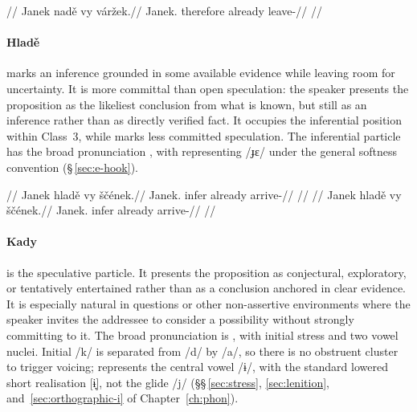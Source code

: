\pex
\begingl
\glpreamble {}//
\gla Janek nadě vy váržek.//
\glb Janek.\Dir{} therefore already leave-\Pf{}//
\glft {}//
\endgl
\xe

\paragraph{Hladě}  marks an inference grounded in some available
evidence while leaving room for uncertainty. It is more committal than open
speculation: the speaker presents the proposition as the likeliest conclusion
from what is known, but still as an inference rather than as directly verified
fact. It occupies the inferential position within Class~3, while
 marks less committed speculation. The inferential particle
 has the broad pronunciation \ipagloss{[ˈxla.ɟɛ]}, with
 representing /ɟɛ/ under the general softness convention
(§\,\ref{sec:e-hook}).

\pex
\a
\begingl
\glpreamble {}//
\gla Janek hladě vy ščének.//
\glb Janek.\Dir{} infer already arrive-\Pf{}//
\glft {}//
\endgl
\a
\begingl
\glpreamble {}//
\gla \ljudge{\#}Janek hladě vy ščének.//
\glb Janek.\Dir{} infer already arrive-\Pf{}//
\glft {}//
\endgl
\xe

\paragraph{Kady}  is the speculative particle. It presents the
proposition as conjectural, exploratory, or tentatively entertained rather
than as a conclusion anchored in clear evidence. It is especially natural in
questions or other non-assertive environments where the speaker invites the
addressee to consider a possibility without strongly committing to it.
The broad pronunciation is \ipagloss{[ˈka.dɨ̞]}, with initial stress and two
vowel nuclei. Initial /k/ is separated from /d/ by /a/, so there is no
obstruent cluster to trigger voicing;  represents the central vowel
/ɨ/, with the standard lowered short realisation [ɨ̞], not the glide /j/
(§§\,\ref{sec:stress}, \ref{sec:lenition}, and~\ref{sec:orthographic-i} of
Chapter~\ref{ch:phon}).

